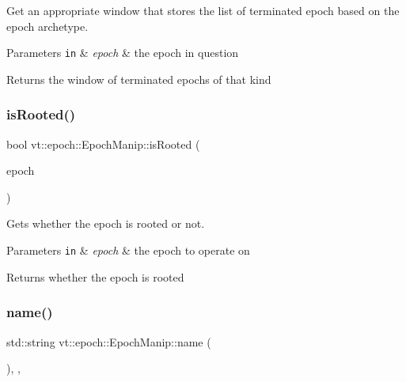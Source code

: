 Get an appropriate window that stores the list of terminated epoch based on the epoch archetype. 


\begin{DoxyParams}[1]{Parameters}
\mbox{\tt in}  & {\em epoch} & the epoch in question\\
\hline
\end{DoxyParams}
\begin{DoxyReturn}{Returns}
the window of terminated epochs of that kind 
\end{DoxyReturn}
\mbox{\label{structvt_1_1epoch_1_1_epoch_manip_a00210a34334fb86984cfbd08bae74929}} 
\subsubsection{\texorpdfstring{is\+Rooted()}{isRooted()}}
{\footnotesize\ttfamily bool vt\+::epoch\+::\+Epoch\+Manip\+::is\+Rooted (\begin{DoxyParamCaption}\item[{\hyperlink{structvt_1_1epoch_1_1_epoch_type}{Epoch\+Type} const \&}]{epoch }\end{DoxyParamCaption})\hspace{0.3cm}{\ttfamily [static]}}



Gets whether the epoch is rooted or not. 


\begin{DoxyParams}[1]{Parameters}
\mbox{\tt in}  & {\em epoch} & the epoch to operate on\\
\hline
\end{DoxyParams}
\begin{DoxyReturn}{Returns}
whether the {\ttfamily epoch} is rooted 
\end{DoxyReturn}
\mbox{\label{structvt_1_1epoch_1_1_epoch_manip_a3dcf9b105619194fddde4e26a638b856}} 
\subsubsection{\texorpdfstring{name()}{name()}}
{\footnotesize\ttfamily std\+::string vt\+::epoch\+::\+Epoch\+Manip\+::name (\begin{DoxyParamCaption}{ }\end{DoxyParamCaption})\hspace{0.3cm}{\ttfamily [inline]}, {\ttfamily [override]}, {\ttfamily [virtual]}}



